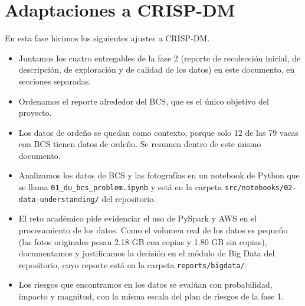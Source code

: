 \section*{Adaptaciones a CRISP-DM}

En esta fase hicimos los siguientes ajustes a CRISP-DM.

\begin{itemize}
  \item Juntamos los cuatro entregables de la fase 2 (reporte de recolección inicial, de descripción, de exploración y de calidad de los datos) en este documento, en secciones separadas.
  \item Ordenamos el reporte alrededor del BCS, que es el único objetivo del proyecto.
  \item Los datos de ordeño se quedan como contexto, porque solo 12 de las 79 vacas con BCS tienen datos de ordeño. Se resumen dentro de este mismo documento.
  \item Analizamos los datos de BCS y las fotografías en un notebook de Python que se llama \nolinkurl{01_du_bcs_problem.ipynb} y está en la carpeta \nolinkurl{src/notebooks/02-data-understanding/} del repositorio.
  \item El reto académico pide evidenciar el uso de PySpark y AWS en el procesamiento de los datos. Como el volumen real de los datos es pequeño (las fotos originales pesan 2.18 GB con copias y 1.80 GB sin copias), documentamos y justificamos la decisión en el módulo de Big Data del repositorio, cuyo reporte está en la carpeta \nolinkurl{reports/bigdata/}.
  \item Los riesgos que encontramos en los datos se evalúan con probabilidad, impacto y magnitud, con la misma escala del plan de riesgos de la fase 1.
\end{itemize}
